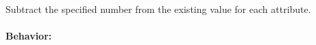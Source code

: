 Subtract the specified number from the existing value for each attribute.

\paragraph{Behavior:}
\begin{itemize}[noitemsep]

\end{itemize}

